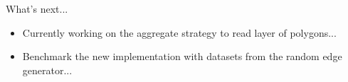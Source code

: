 \documentclass{beamer}
\begin{document}
\begin{frame}{What's next...}
    \begin{itemize}
        \item Currently working on the aggregate strategy to read layer of polygons...
        \item Benchmark the new implementation with datasets from the random edge generator...
    \end{itemize}
\end{frame}
\end{document}
